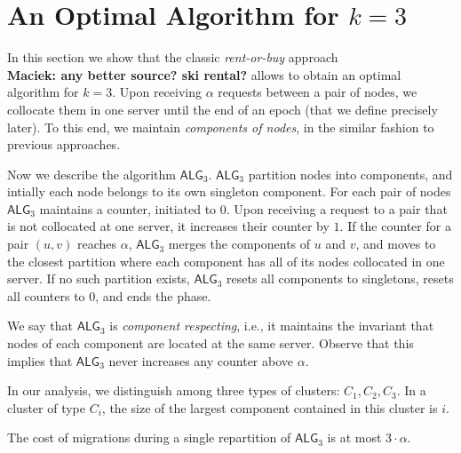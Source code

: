 \documentclass[manuscript,screen=true]{acmart}
\newcommand{\TAlg}{{\ensuremath{\textsf{ALG}_{3}}}\xspace} %
\newcommand\maciek[1]{\color{brown}\textbf{\\ Maciek: #1}\color{black}}
\begin{document}
\section{An Optimal Algorithm for $k=3$}
\label{sec:k3}

In this section we show that the classic \emph{rent-or-buy} approach\cite{borodin-book}\maciek{any better source? ski rental?} allows to obtain an optimal algorithm for $k=3$.
Upon receiving $\alpha$ requests between a pair of nodes, we collocate them in one server until the end of an epoch (that we define precisely later).
To this end, we maintain \emph{components of nodes}, in the similar fashion to previous approaches\cite{repartition-disc}.


Now we describe the algorithm \TAlg.
\TAlg partition nodes into components, and
intially each node belongs to its own singleton component.
For each pair of nodes \TAlg maintains a counter, initiated to $0$. 
Upon receiving a request to a pair that is not collocated at one server, it increases their counter by $1$.
If the counter for a pair $(u,v)$ reaches $\alpha$, \TAlg merges the components of $u$ and $v$, and moves to the closest partition where each component has all of its nodes collocated in one server.
If no such partition exists, \TAlg resets all components to singletons, resets all counters to $0$, and ends the phase.


We say that \TAlg is \emph{component respecting}, i.e., it maintains the invariant that nodes of each component are located at the same server.
Observe that this implies that \TAlg never increases any counter above $\alpha$.

In our analysis, we distinguish among three types of clusters: $C_1, C_2, C_3$. In a cluster of type $C_i$, the size of the largest component contained in this cluster is $i$.

\begin{lemma}
  \label{lem:1req}
  The cost of migrations during a single repartition of \TAlg is at most $3\cdot\alpha$.
\end{lemma}
\end{document}
